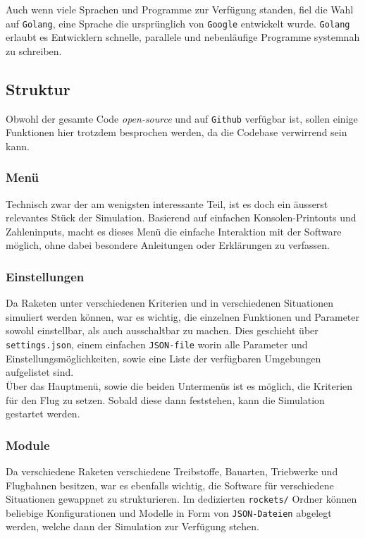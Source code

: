 \documentclass[11pt]{article}
\begin{document}
Auch wenn viele Sprachen und Programme zur Verfügung standen, fiel die Wahl auf
\texttt{Golang}, eine Sprache die ursprünglich von \texttt{Google} entwickelt wurde. \texttt{Golang}
erlaubt es Entwicklern schnelle, parallele und nebenläufige Programme systemnah
zu schreiben.
\subsection{Struktur}
\label{sec:orgf787979}
Obwohl der gesamte Code \emph{open-source} und auf \texttt{Github} verfügbar ist, sollen einige
Funktionen hier trotzdem besprochen werden, da die Codebase verwirrend sein
kann.
\subsubsection{Menü}
\label{sec:org274bade}
Technisch zwar der am wenigsten interessante Teil, ist es doch ein äusserst
relevantes Stück der Simulation. Basierend auf einfachen Konsolen-Printouts und
Zahleninputs, macht es dieses Menü die einfache Interaktion mit der Software
möglich, ohne dabei besondere Anleitungen oder Erklärungen zu verfassen. \\
\subsubsection{Einstellungen}
\label{sec:orgbb22068}
Da Raketen unter verschiedenen Kriterien und in verschiedenen Situationen
simuliert werden können, war es wichtig, die einzelnen Funktionen und Parameter
sowohl einstellbar, als auch ausschaltbar zu machen. Dies geschieht über
\texttt{settings.json}, einem einfachen \texttt{JSON-file} worin alle Parameter und
Einstellungsmöglichkeiten, sowie eine Liste der verfügbaren Umgebungen
aufgelistet sind.\\
Über das Hauptmenü, sowie die beiden Untermenüs ist es möglich, die Kriterien
für den Flug zu setzen. Sobald diese dann feststehen, kann die Simulation
gestartet werden.
\subsubsection{Module}
\label{sec:orge0799a9}
Da verschiedene Raketen verschiedene Treibstoffe, Bauarten, Triebwerke und
Flugbahnen besitzen, war es ebenfalls wichtig, die Software für verschiedene
Situationen gewappnet zu strukturieren. Im dedizierten \texttt{rockets/} Ordner können
beliebige Konfigurationen und Modelle in Form von \texttt{JSON-Dateien} abgelegt werden,
welche dann der Simulation zur Verfügung stehen.
\end{document}
